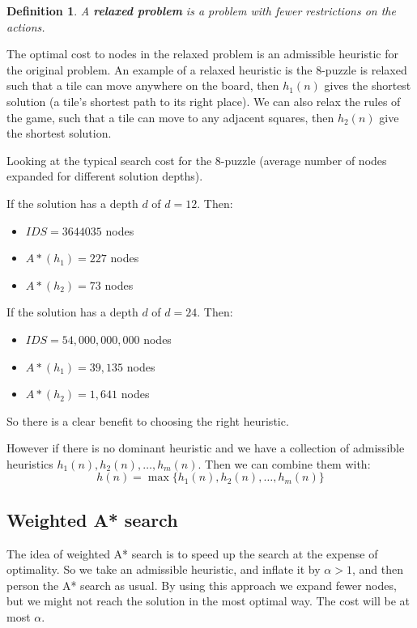 \documentclass{article}
\newtheorem{definition}{Definition}[section]
\begin{document}
\begin{definition}
A \textbf{relaxed problem} is a problem with fewer restrictions on the actions.
\end{definition}

The optimal cost to nodes in the relaxed problem is an admissible heuristic for
the original problem. An example of a relaxed heuristic is the 8-puzzle is
relaxed such that a tile can move anywhere on the board, then $h_1(n)$ gives the
shortest solution (a tile's shortest path to its right place). We can also relax
the rules of the game, such that a tile can move to any adjacent squares, then
$h_2(n)$ give the shortest solution.

Looking at the typical search cost for the 8-puzzle (average number of nodes
expanded for different solution depths). 

If the solution has a depth $d$ of $d = 12 $. Then:
\begin{itemize}
  \item $IDS = 3644035$ nodes
  \item $A*(h_1) = 227 $ nodes
  \item $A*(h_2) = 73$ nodes
\end{itemize}

If the solution has a depth $d$ of $d = 24 $. Then:
\begin{itemize}
  \item $IDS = 54,000,000,000$ nodes
  \item $A*(h_1) = 39,135 $ nodes
  \item $A*(h_2) = 1,641$ nodes
\end{itemize}

So there is a clear benefit to choosing the right heuristic\cite[p.
31]{presentation:informed_search}. 

However if there is no dominant heuristic and we have a collection of admissible
heuristics $h_1(n),h_2(n), \dots , h_m(n)$. Then we can combine them with:
\[h(n) = \max\{h_1(n),h_2(n), \dots , h_m(n) \}\]

\subsection{Weighted A* search}%
\label{sub:weighted_a_search}

The idea of weighted A* search is to speed up the search at the expense of
optimality. So we take an admissible heuristic, and inflate it by $\alpha > 1$,
and then person the A* search as usual. By using this approach we expand fewer
nodes, but we might not reach the solution in the most optimal way. The cost
will be at most $\alpha$.
\end{document}
